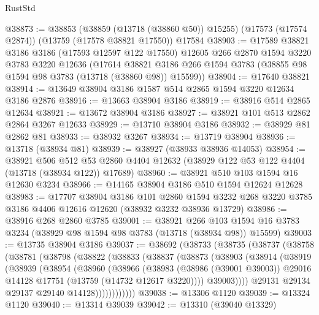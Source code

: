 \begin{lexlean}{RustStd}
\begin{coremodule}
@38873 := @38853
    (@38859 (@13718 (@38860 @50)) @15255)
    (@17573 (@17574 @2874))
    (@13759 (@17578 @38821 @17550))
    @17584
@38903 := @17589
    @38821
    @3186
    @3186
    (@17593 @12597 @122 @17550)
    @12605
    @266
    @2870
    @1594
    @3220
    @3783
    @3220
    @12636
    (@17614 @38821 @3186 @266 @1594 @3783 (@38855 @98 @1594 @98 @3783 (@13718 (@38860 @98)) @15599))
@38904 := @17640 @38821
@38914 := @13649 @38904 @3186 @1587 @514 @2865 @1594 @3220 @12634 @3186 @2876
@38916 := @13663 @38904 @3186
@38919 := @38916 @514 @2865 @12634
@38921 := @13672 @38904 @3186
@38927 := @38921 @101 @513 @2862 @2864 @3267 @12633
@38929 := @13710 @38904 @3186
@38932 := @38929 @81 @2862 @81
@38933 := @38932 @3267
@38934 := @13719 @38904
@38936 := @13718 (@38934 @81)
@38939 := @38927 (@38933 @38936 @14053)
@38954 := @38921
    @506
    @512
    @53
    @2860
    @4404
    @12632
    (@38929 @122 @53 @122 @4404 (@13718 (@38934 @122)) @17689)
@38960 := @38921 @510 @103 @1594 @16 @12630 @3234
@38966 := @14165 @38904 @3186 @510 @1594 @12624 @12628
@38983 := @17707
    @38904
    @3186
    @101
    @2860
    @1594
    @3232
    @268
    @3220
    @3785
    @3186
    @4406
    @12616
    @12620
    (@38932 @3232 @38936 @13729)
@38986 := @38916 @268 @2860 @3785
@39001 := @38921
    @266
    @103
    @1594
    @16
    @3783
    @3234
    (@38929 @98 @1594 @98 @3783 (@13718 (@38934 @98)) @15599)
@39003 := @13735 @38904 @3186
@39037 := @38692
    (@38733
      (@38735
        (@38737
          (@38758
            (@38781
              (@38798
                (@38822
                  (@38833
                    (@38837
                      (@38873
                        (@38903
                          (@38914
                            (@38919
                              (@38939
                                (@38954
                                  (@38960
                                    (@38966
                                      (@38983
                                        (@38986 (@39001 @39003))
                                        @29016
                                        @14128
                                        @17751
                                        (@13759 (@14732 @12617 @3220))))
                                    @39003))))
                            @29131
                            @29134
                            @29137
                            @29140
                            @14128))))))))))))
@39038 := @13306 @1120
@39039 := @13324 @1120
@39040 := @13314 @39039
@39042 := @13310 (@39040 @13329)

\end{coremodule}
\end{lexlean}

